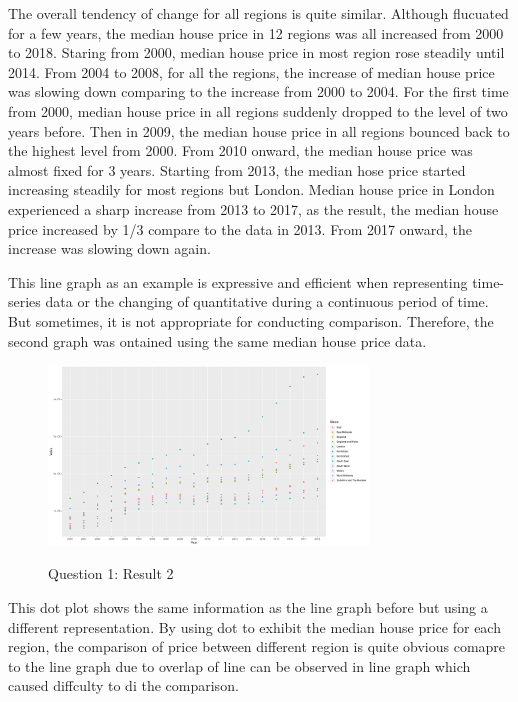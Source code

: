 \documentclass{article}
\begin{document}
The overall tendency of change for all regions is quite similar. Although flucuated for a few years, 
the median house price in 12 regions was all increased from 2000 to 2018. Staring from 2000, median house 
price in most region rose steadily until 2014. From 2004 to 2008, for all the regions, the increase of 
median house price was slowing down comparing to the increase from 2000 to 2004. For the first time from 2000, 
median house price in all regions suddenly dropped to the level of two years before. Then in 2009, the median 
house price in all regions bounced back to the highest level from 2000. From 2010 onward, the median house 
price was almost fixed for 3 years. Starting from 2013, the median hose price started increasing steadily for 
most regions but London. Median house price in London experienced a sharp increase from 2013 to 2017, 
as the result, the median house price increased by 1/3 compare to the data in 2013. From 2017 onward, 
the increase was slowing down again.

This line graph as an example is expressive and efficient when representing time-series data or the changing 
of quantitative during a continuous period of time. But sometimes, it is not appropriate for conducting 
comparison. Therefore, the second graph was ontained using the same median house price data.

\begin{figure}[htb]
  \begin{minipage}[b]{1.0\linewidth}
    \centering
    \centerline{\includegraphics[width=8.5cm]{Q1Geom_point}}
    \centerline{Question 1: Result 2}\medskip
  \end{minipage}
\end{figure}

This dot plot shows the same information as the line graph before but using a different representation. 
By using dot to exhibit the median house price for each region, the comparison of price between different 
region is quite obvious comapre to the line graph due to overlap of line can be observed in line graph 
which caused diffculty to di the comparison.
\end{document}
